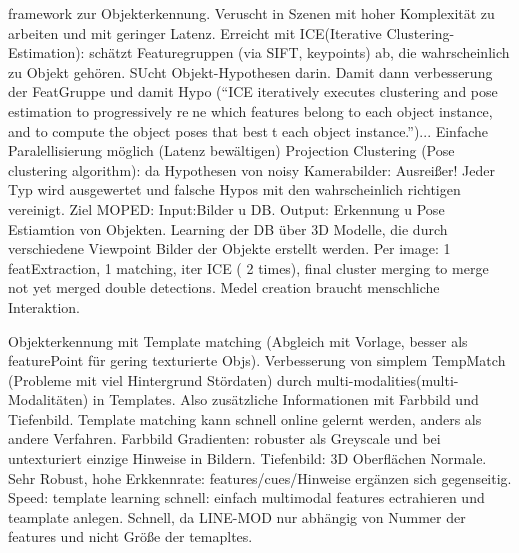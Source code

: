 \cite{moped} \newline
framework zur Objekterkennung. Veruscht in Szenen mit hoher Komplexität zu arbeiten und mit geringer Latenz. \newline
Erreicht mit ICE(Iterative Clustering-Estimation): schätzt Featuregruppen (via SIFT, keypoints) ab, die wahrscheinlich zu Objekt gehören. SUcht Objekt-Hypothesen darin. Damit dann verbesserung der FeatGruppe und damit Hypo (``ICE iteratively executes clustering and pose estimation to progressively rene which features belong to each object instance, and to compute the object poses that bestt each object instance.'')... Einfache Paralellisierung möglich (Latenz bewältigen) \newline
Projection Clustering (Pose clustering algorithm): da Hypothesen von noisy Kamerabilder: Ausreißer! Jeder Typ wird ausgewertet und falsche Hypos mit den wahrscheinlich richtigen vereinigt. \newline
Ziel MOPED: Input:Bilder u DB. Output: Erkennung u Pose Estiamtion von Objekten. \newline
Learning der DB über 3D Modelle, die durch verschiedene Viewpoint Bilder der Objekte erstellt werden. \newline
Per image: 1 featExtraction, 1 matching, iter ICE ( 2 times), final cluster merging to merge not yet merged double detections. \newline
Medel creation braucht menschliche Interaktion. \par


\cite{multimodalTemplate} \newline
Objekterkennung mit Template matching (Abgleich mit Vorlage, besser als featurePoint für gering texturierte Objs). Verbesserung von simplem TempMatch (Probleme mit viel Hintergrund Stördaten) durch multi-modalities(multi-Modalitäten) in Templates. Also zusätzliche Informationen mit Farbbild und Tiefenbild.\newline
Template matching kann schnell online gelernt werden, anders als andere Verfahren. \newline 
Farbbild Gradienten: robuster als Greyscale und bei untexturiert einzige Hinweise in Bildern. \newline
Tiefenbild: 3D Oberflächen Normale. \newline
Sehr Robust, hohe Erkkennrate: features/cues/Hinweise ergänzen sich gegenseitig.  \newline
Speed: template learning schnell: einfach multimodal features ectrahieren und teamplate anlegen. Schnell, da LINE-MOD nur abhängig von Nummer der features und nicht Größe der temapltes. \par

